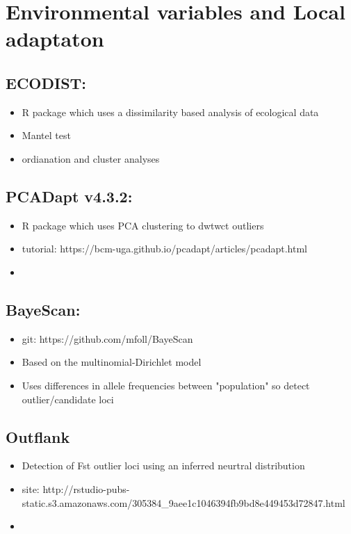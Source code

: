 \documentclass[document.tex]{subfiles}
\begin{document}
\section*{Environmental variables and Local adaptaton}

    \subsection{ECODIST: }
        \begin{itemize}
        \item R package which uses a dissimilarity based analysis of ecological data 
        \item Mantel test
        \item ordianation and cluster analyses
        \end{itemize} 


        \subsection{PCADapt v4.3.2: }
        \begin{itemize}
        \item R package which uses PCA clustering to dwtwct outliers
        \item tutorial: https://bcm-uga.github.io/pcadapt/articles/pcadapt.html
        \item 
        \end{itemize} 

        \subsection{BayeScan: }
        \begin{itemize}
        \item git: https://github.com/mfoll/BayeScan
        \item Based on the multinomial-Dirichlet model
        \item Uses differences in allele frequencies between "population" so detect outlier/candidate loci
        \end{itemize} 

        \subsection{Outflank }
        \begin{itemize}
        \item Detection of Fst outlier loci using an inferred neurtral distribution
        \item site: http://rstudio-pubs-static.s3.amazonaws.com/305384_9aee1c1046394fb9bd8e449453d72847.html
        \item 
        \end{itemize} 
\end{document}

